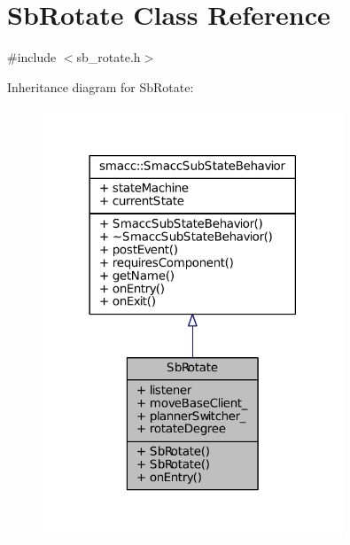 \hypertarget{classSbRotate}{}\section{Sb\+Rotate Class Reference}
\label{classSbRotate}


{\ttfamily \#include $<$sb\+\_\+rotate.\+h$>$}



Inheritance diagram for Sb\+Rotate\+:
\nopagebreak
\begin{figure}[H]
\begin{center}
\leavevmode
\includegraphics[width=254pt]{classSbRotate__inherit__graph}
\end{center}
\end{figure}



